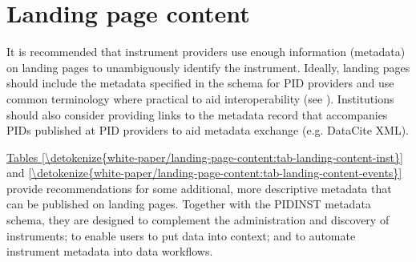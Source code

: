 \documentclass[a4paper,10pt,english]{sphinxmanual}
\begin{document}
\section{Landing page content}
\label{\detokenize{white-paper/landing-page-content:landing-page-content}}\label{\detokenize{white-paper/landing-page-content:id1}}\label{\detokenize{white-paper/landing-page-content::doc}}
It is recommended that instrument providers use enough information
(metadata) on landing pages to unambiguously identify the instrument.
Ideally, landing pages should include the metadata specified in the
schema for PID providers and use common terminology where practical to
aid interoperability (see {\hyperref[\detokenize{white-paper/metadata-schema-recommendations:pidinst-metadata-schema-terminologies}]{}}).
Institutions should also consider providing links to the metadata record
that accompanies PIDs published at PID providers to aid metadata
exchange (e.g. DataCite XML).

\hyperref[\detokenize{white-paper/landing-page-content:tab-landing-content-inst}]{Tables \ref{\detokenize{white-paper/landing-page-content:tab-landing-content-inst}}} and
\hyperref[\detokenize{white-paper/landing-page-content:tab-landing-content-events}]{\ref{\detokenize{white-paper/landing-page-content:tab-landing-content-events}}} provide recommendations for
some additional, more descriptive metadata that can be published on
landing pages. Together with the PIDINST metadata schema, they are
designed to complement the administration and discovery of
instruments; to enable users to put data into context; and to automate
instrument metadata into data workflows.
\end{document}
